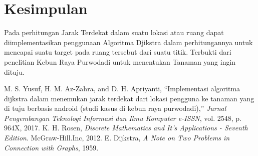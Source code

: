 \documentclass[conference]{IEEEtran}
\begin{document}
\section{Kesimpulan}
Pada perhitungan Jarak Terdekat dalam suatu lokasi atau ruang dapat diimplementasikan penggunaan Algoritma Djikstra
dalam perhitungannya untuk mencapai suatu target pada ruang
tersebut dari suatu titik. Terbukti dari penelitian Kebun Raya
Purwodadi untuk menentukan Tanaman yang ingin dituju.

\begin{thebibliography}{00}
     M. S. Yusuf, H. M. Az-Zahra, and D. H. Apriyanti, “Implementasi
    algoritma dijkstra dalam menemukan jarak terdekat dari lokasi pengguna
    ke tanaman yang di tuju berbasis android (studi kasus di kebun raya purwodadi),” \textit{Jurnal Pengembangan Teknologi Informasi dan Ilmu Komputer
    e-ISSN}, vol. 2548, p. 964X, 2017.
     K. H. Rosen, \textit{Discrete Mathematics and It’s Applications - Seventh
    Edition}. McGraw-Hill.Inc, 2012.
     E. Dijkstra, \textit{A Note on Two Problems in Connection with Graphs}, 1959.
\end{thebibliography}
\end{document}
